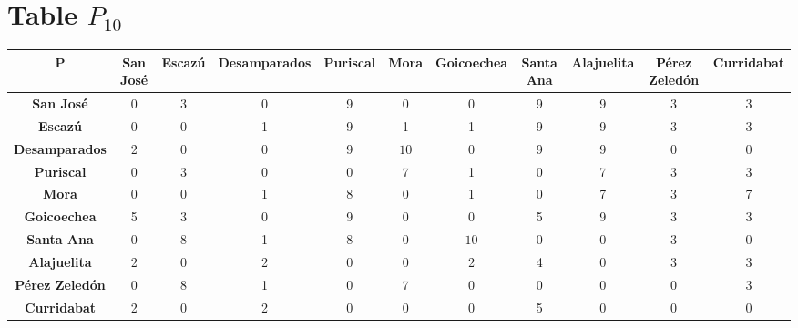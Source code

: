 \documentclass{article}
\begin{document}
\section{Table $P_{10}$}
\begin{center}
    \begin{tabular}{|c||c|c|c|c|c|c|c|c|c|c|}
        \hline
        \textbf{P} & \textbf{San José} & \textbf{Escazú} & \textbf{Desamparados} & \textbf{Puriscal} & \textbf{Mora} & \textbf{Goicoechea} & \textbf{Santa Ana} & \textbf{Alajuelita} & \textbf{Pérez Zeledón} & \textbf{Curridabat} \\
        \hline
        \hline
        \textbf{San José}& 0 & 3 & 0 & 9 & 0 & 0 & 9 & 9 & 3 & 3 \\
        \hline
        \textbf{Escazú}& 0 & 0 & 1 & 9 & 1 & 1 & 9 & 9 & 3 & 3 \\
        \hline
        \textbf{Desamparados}& 2 & 0 & 0 & 9 & \cellcolor[HTML]{D74894}$10$ & 0 & 9 & 9 & 0 & 0 \\
        \hline
        \textbf{Puriscal}& 0 & 3 & 0 & 0 & 7 & 1 & 0 & 7 & 3 & 3 \\
        \hline
        \textbf{Mora}& 0 & 0 & 1 & 8 & 0 & 1 & 0 & 7 & 3 & 7 \\
        \hline
        \textbf{Goicoechea}& 5 & 3 & 0 & 9 & 0 & 0 & 5 & 9 & 3 & 3 \\
        \hline
        \textbf{Santa Ana}& 0 & 8 & 1 & 8 & 0 & \cellcolor[HTML]{D74894}$10$ & 0 & 0 & 3 & 0 \\
        \hline
        \textbf{Alajuelita}& 2 & 0 & 2 & 0 & 0 & 2 & 4 & 0 & 3 & 3 \\
        \hline
        \textbf{Pérez Zeledón}& 0 & 8 & 1 & 0 & 7 & 0 & 0 & 0 & 0 & 3 \\
        \hline
        \textbf{Curridabat}& 2 & 0 & 2 & 0 & 0 & 0 & 5 & 0 & 0 & 0 \\
        \hline
    \end{tabular}
\end{center}
\end{document}
